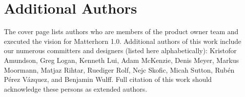 \documentclass{sig-alternate}
\begin{document}


\section{Additional Authors}
The cover page lists authors who are members of the product owner team and executed the vision for Matterhorn 1.0.  Additional authors of this work include our numerous committers and designers (listed here alphabetically): Kristofor Amundson, Greg Logan, Kenneth Lui, Adam McKenzie, Denis Meyer, Markus Moormann, Matjaz Rihtar, Ruediger Rolf, Nejc Skofic, Micah Sutton, Rub\'{e}n P\'{e}rez V\'{a}zquez, and Benjamin Wulff.  Full citation of this work should acknowledge these persons as extended authors.
\end{document}
